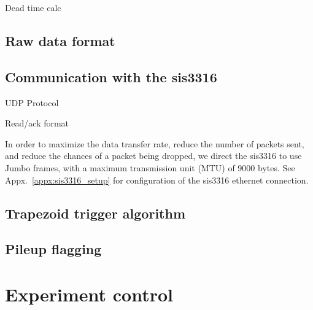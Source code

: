 
Dead time calc

\cite{sis3316_manual, sis3316_udp_addendum}




\subsection{Raw data format}



\subsection{Communication with the sis3316}\label{sec:sis3316_udp_protocol}


UDP Protocol

Read/ack format

In order to maximize the data transfer rate, reduce the number of packets sent, and reduce the chances of a packet being dropped, we direct the sis3316 to use Jumbo frames, with a maximum transmission unit (MTU) of 9000 bytes. See Appx.~\ref{appx:sis3316_setup} for configuration of the sis3316 ethernet connection.


\subsection{Trapezoid trigger algorithm}



\subsection{Pileup flagging}\label{sec:sis3316_pileup}



\section{Experiment control}\label{sec:slow_control}

